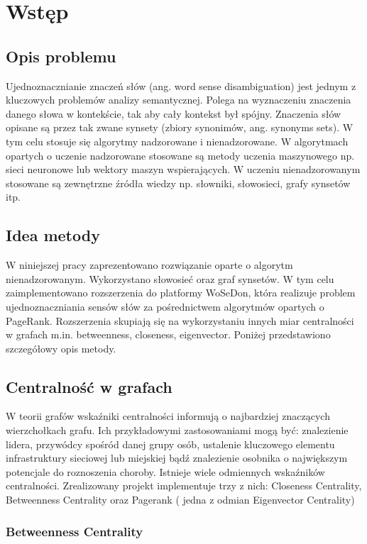 \chapter{Wstęp}
\section{Opis problemu}
Ujednoznacznianie znaczeń słów (ang. word sense disambiguation) jest jednym z kluczowych problemów analizy semantycznej. Polega na wyznaczeniu znaczenia danego słowa w kontekście, tak aby cały kontekst był spójny. Znaczenia słów opisane są przez tak zwane synsety (zbiory synonimów, ang. synonyms sets). W tym celu stosuje się algorytmy nadzorowane i nienadzorowane. W algorytmach opartych o uczenie nadzorowane stosowane są metody uczenia maszynowego np. sieci neuronowe lub wektory maszyn wspierających. W uczeniu nienadzorowanym stosowane są zewnętrzne źródła wiedzy np. słowniki, słowosieci, grafy synsetów itp. 

\section{Idea metody}
W niniejszej pracy zaprezentowano rozwiązanie oparte o algorytm nienadzorowanym. Wykorzystano słowosieć oraz graf synsetów. W tym celu zaimplementowano rozszerzenia do platformy WoSeDon, która realizuje problem ujednoznaczniania sensów słów za pośrednictwem algorytmów opartych o PageRank. Rozszerzenia skupiają się na wykorzystaniu innych miar centralności w grafach m.in. betweenness, closeness, eigenvector. Poniżej przedstawiono szczegółowy opis metody.

\section{Centralność w grafach}

W teorii grafów wskaźniki centralności informują o najbardziej znaczących wierzchołkach grafu. Ich przykładowymi zastosowaniami mogą być: znalezienie lidera, przywódcy spośród danej grupy osób, ustalenie kluczowego elementu infrastruktury sieciowej lub miejskiej bądź znalezienie osobnika o największym potencjale do roznoszenia choroby. Istnieje wiele odmiennych wskaźników centralności. Zrealizowany projekt implementuje trzy z nich: Closeness Centrality, Betweenness Centrality oraz Pagerank ( jedna z odmian Eigenvector Centrality)

\newpage

\subsection{Betweenness Centrality}

